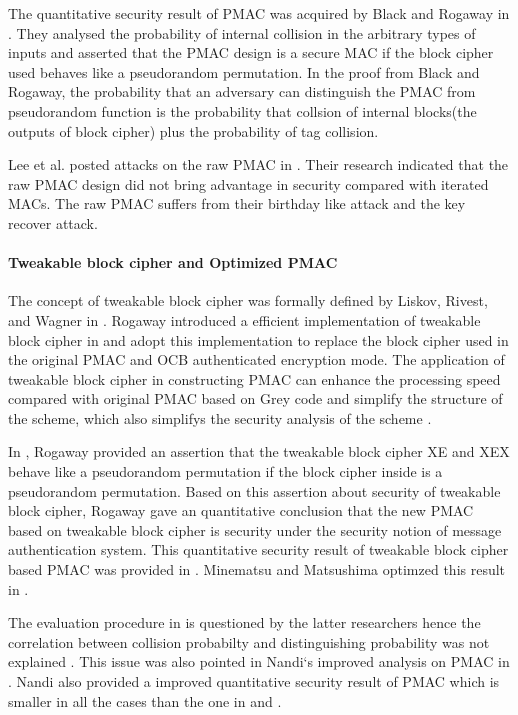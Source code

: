 \documentclass{article}
\begin{document}
The quantitative security result of PMAC was acquired by Black and Rogaway in \cite{pmac}. They analysed the probability of internal collision in the arbitrary types of inputs and asserted that the PMAC design is a secure MAC if the block cipher used behaves like a pseudorandom permutation. In the proof from Black and Rogaway, the probability that an adversary can distinguish the PMAC from pseudorandom function is the probability that collsion of internal blocks(the outputs of block cipher) plus the probability of tag collision. 

Lee et al. posted attacks on the raw PMAC in \cite{pmac_forgery}. Their research indicated that the raw PMAC design did not bring advantage in security compared with iterated MACs. The raw PMAC suffers from their birthday like attack and the key recover attack.
 
\paragraph{Tweakable block cipher and Optimized PMAC}
The concept of tweakable block cipher was formally defined by Liskov, Rivest, and Wagner in \cite{tweak}. Rogaway introduced a efficient implementation of tweakable block cipher in \cite{tweak_pmac}and adopt this implementation to replace the block cipher used in the original PMAC and OCB authenticated encryption mode.
The application of tweakable block cipher in constructing PMAC can enhance the processing speed compared with original PMAC based on Grey code and simplify the structure of the scheme, which also simplifys the security analysis of the scheme . 

In \cite{tweak_pmac}, Rogaway provided an assertion that the tweakable block cipher XE and XEX behave like a pseudorandom permutation if the block cipher inside is a pseudorandom permutation. Based on this assertion about security of tweakable block cipher, Rogaway gave an quantitative conclusion that the new PMAC based on tweakable block cipher is security under the security notion of message authentication system. This quantitative security result of tweakable block cipher based PMAC was provided in \cite{tweak_pmac}.
Minematsu and Matsushima optimzed this result in \cite{new}. 

The evaluation procedure in \cite{pmac} is questioned by the latter researchers hence the correlation between collision probabilty and 
distinguishing probability was not explained . This issue was also pointed in Nandi`s improved analysis on PMAC in \cite{improve_pmac}. Nandi also provided a improved quantitative security result of PMAC which is smaller in all the cases than the one in \cite{pmac} and \cite{new}. 
\end{document}
